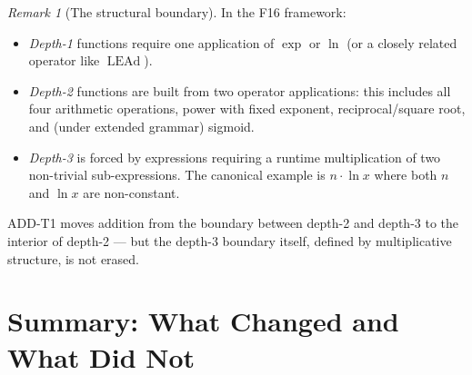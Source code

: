\documentclass[12pt,a4paper]{article}
\theoremstyle{definition}
\theoremstyle{remark}
\newtheorem{remark}[theorem]{Remark}
\newcommand{\LEAd}{\operatorname{LEAd}}
\begin{document}
\begin{remark}[The structural boundary]
In the F16 framework:
\begin{itemize}
  \item \emph{Depth-1} functions require one application of $\exp$ or $\ln$
    (or a closely related operator like $\LEAd$).
  \item \emph{Depth-2} functions are built from two operator applications:
    this includes all four arithmetic operations, power with fixed exponent,
    reciprocal/square root, and (under extended grammar) sigmoid.
  \item \emph{Depth-3} is forced by expressions requiring a runtime
    multiplication of two non-trivial sub-expressions.  The canonical example
    is $n \cdot \ln x$ where both $n$ and $\ln x$ are non-constant.
\end{itemize}
ADD-T1 moves addition from the boundary between depth-2 and depth-3 to the
interior of depth-2 --- but the depth-3 boundary itself, defined by
multiplicative structure, is not erased.
\end{remark}

\section{Summary: What Changed and What Did Not}
\label{sec:summary}
\end{document}
